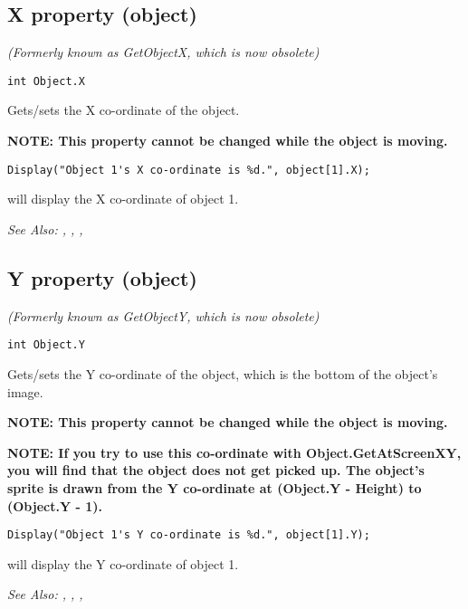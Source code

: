 \subsection{X property (object)}\label{Object.X}%

\it{(Formerly known as GetObjectX, which is now obsolete)}

\begin{verbatim}
int Object.X
\end{verbatim}
Gets/sets the X co-ordinate of the object.

\bf{NOTE:} This property cannot be changed while the object is moving.

\begin{verbatim}
Display("Object 1's X co-ordinate is %d.", object[1].X);
\end{verbatim}
will display the X co-ordinate of object 1.

\it{See Also:} , ,
, 


\subsection{Y property (object)}\label{Object.Y}%

\it{(Formerly known as GetObjectY, which is now obsolete)}

\begin{verbatim}
int Object.Y
\end{verbatim}
Gets/sets the Y co-ordinate of the object, which is the bottom of the object's image.

\bf{NOTE:} This property cannot be changed while the object is moving.

\bf{NOTE:} If you try to use this co-ordinate with Object.GetAtScreenXY, you will find that
the object does not get picked up. The object's sprite is drawn from the Y co-ordinate
at (Object.Y - Height) to (Object.Y - 1).

\begin{verbatim}
Display("Object 1's Y co-ordinate is %d.", object[1].Y);
\end{verbatim}
will display the Y co-ordinate of object 1.

\it{See Also:} ,
, ,




